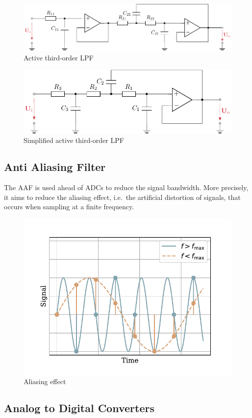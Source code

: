 \begin{figure}[!htb]
  \centering
  \includegraphics[scale=1]{figures/electronics/lowpass/lp_active_3ord_bessel/lp_active_3ord_bessel}
  \caption[Active third-order \ac{LPF}]{Active third-order \ac{LPF}%
    \label{fig:lp_active_3ord_bessel}}
\end{figure}

\begin{figure}[!htb]
  \centering
  \includegraphics[scale=1]{figures/electronics/lowpass/lp_active_3ord_bessel_simple/lp_active_3ord_bessel_simple}
  \caption[Simplified active third-order \ac{LPF}]{Simplified active third-order \ac{LPF}%
    \label{fig:lp_active_3ord_bessel_simple}}
\end{figure}

\subsection{Anti Aliasing Filter}
The \acf{AAF} is used ahead of \ac{ADC}s to reduce the signal bandwidth. More precisely, it aims to reduce the aliasing effect, i.e.\ the artificial distortion of signals, that occurs when sampling at a finite frequency.

\begin{figure}[!htb]
  \centering
  \includegraphics[scale=0.72]{figures/electronics/aaf/plot_aliasing}
  \caption[Aliasing]{Aliasing effect%
    \label{fig:plot_aliasing}}
\end{figure}

\subsection{Analog to Digital Converters}
